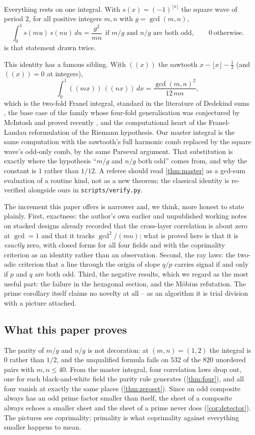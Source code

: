 \documentclass[11pt]{amsart}
\theoremstyle{definition}
\theoremstyle{remark}
\begin{document}
Everything rests on one integral. With $s(x)=(-1)^{\lfloor x\rfloor}$ the square wave of period $2$, for all positive integers $m,n$ with $g=\gcd(m,n)$,
\[
\int_0^1 s(mu)\,s(nu)\,du=\frac{g^2}{mn}\ \ \text{if $m/g$ and $n/g$ are both odd},\qquad 0\ \text{otherwise.}
\]
 is that statement drawn twice.

This identity has a famous sibling. With $((x))$ the sawtooth $x-\lfloor x\rfloor-\tfrac12$ (and $((x))=0$ at integers),
\[
\int_0^1 ((mx))\,((nx))\,dx=\frac{\gcd(m,n)^2}{12\,mn},
\]
which is the two-fold Franel integral, standard in the literature of Dedekind sums \cite{apostol}, the base case of the family whose four-fold generalisation was conjectured by McIntosh and proved recently \cite{mcintosh}, and the computational heart of the Franel-Landau reformulation of the Riemann hypothesis. Our master integral is the same computation with the sawtooth's full harmonic comb replaced by the square wave's odd-only comb, by the same Parseval argument. That substitution is exactly where the hypothesis ``$m/g$ and $n/g$ both odd'' comes from, and why the constant is $1$ rather than $1/12$. A referee should read \cref{thm:master} as a gcd-sum evaluation of a routine kind, not as a new theorem; the classical identity is re-verified alongside ours in \texttt{scripts/verify.py}.

The increment this paper offers is narrower and, we think, more honest to state plainly. First, exactness: the author's own earlier and unpublished working notes on stacked designs already recorded that the cross-layer correlation is about zero at $\gcd=1$ and that it tracks $\gcd^2/(mn)$; what is proved here is that it is \emph{exactly} zero, with closed forms for all four fields and with the coprimality criterion as an identity rather than an observation. Second, the ray laws: the two-adic criterion that a line through the origin of slope $q/p$ carries signal if and only if $p$ and $q$ are both odd. Third, the negative results, which we regard as the most useful part: the failure in the hexagonal section, and the M\"obius refutation. The prime corollary itself claims no novelty at all -- as an algorithm it is trial division with a picture attached.

\subsection{What this paper proves}
\label{sec:roadmap}

The parity of $m/g$ and $n/g$ is not decoration: at $(m,n)=(1,2)$ the integral is $0$ rather than $1/2$, and the unqualified formula fails on $532$ of the $820$ unordered pairs with $m,n\le 40$. From the master integral, four correlation laws drop out, one for each black-and-white field the parity rule generates (\cref{thm:four}), and all four vanish at exactly the same places (\cref{thm:zeroset}). Since an odd composite always has an odd prime factor smaller than itself, the sheet of a composite always echoes a smaller sheet and the sheet of a prime never does (\cref{cor:detector}). The pictures see coprimality; primality is what coprimality against everything smaller happens to mean.
\end{document}
